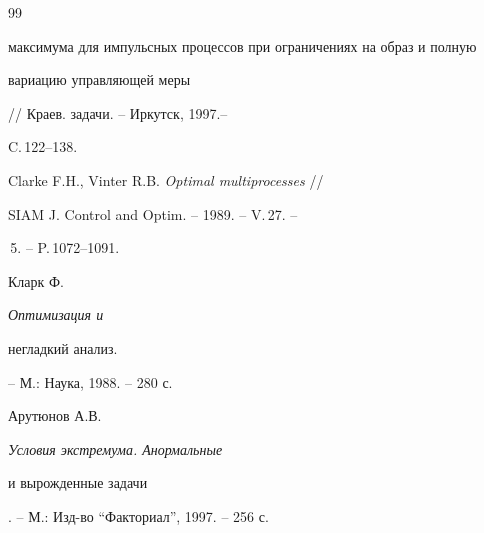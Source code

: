 \begin{thebibliography}{99}
{максимума для импульсных процессов при ограничениях на образ и полную


вариацию управляющей меры} // Краев. задачи. -- Иркутск, 1997.--


C.\,122--138.




Clarke F.H., Vinter R.B. {\em Optimal multiprocesses} //


SIAM J. Control and Optim. -- 1989. -- V.\,27. --


\No\,5. -- P.\,1072--1091.




Кларк Ф. {\em Оптимизация и


негладкий анализ.} -- М.: Наука, 1988. -- 280 с.




Арутюнов А.В. {\em Условия экстремума. Анормальные


и вырожденные задачи}. -- М.: Изд-во ``Факториал'', 1997. -- 256 с.





\end{thebibliography}





\vskip 2cm












\label{end}





